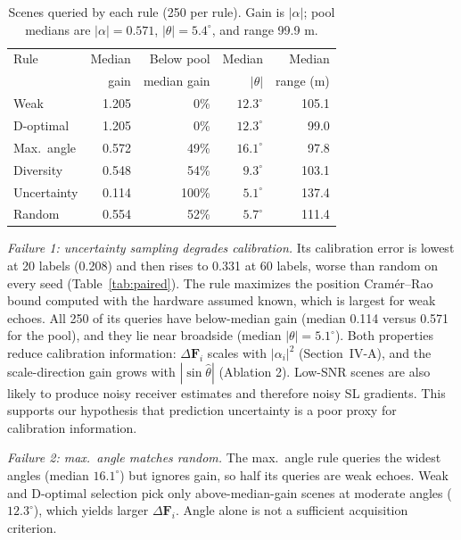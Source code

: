 \documentclass[conference]{IEEEtran}
\newcommand{\F}{\mathbf{F}}
\begin{document}
\begin{table}[t]\centering\small
\caption{Scenes queried by each rule (250 per rule). Gain is $|\alpha|$; pool medians are $|\alpha|=0.571$, $|\theta|=5.4^\circ$, and range 99.9 m.}\label{tab:queries}
\setlength{\tabcolsep}{4pt}
\begin{tabular}{lrrrr}\toprule
Rule & Median & Below pool & Median & Median\\
 & gain & median gain & $|\theta|$ & range (m)\\\midrule
Weak & 1.205 & 0\% & $12.3^\circ$ & 105.1\\
D-optimal & 1.205 & 0\% & $12.3^\circ$ & 99.0\\
Max.\ angle & 0.572 & 49\% & $16.1^\circ$ & 97.8\\
Diversity & 0.548 & 54\% & $9.3^\circ$ & 103.1\\
Uncertainty & 0.114 & 100\% & $5.1^\circ$ & 137.4\\
Random & 0.554 & 52\% & $5.7^\circ$ & 111.4\\\bottomrule
\end{tabular}
\end{table}

\emph{Failure 1: uncertainty sampling degrades calibration.} Its calibration error is lowest at 20 labels (0.208) and then rises to 0.331 at 60 labels, worse than random on every seed (Table~\ref{tab:paired}). The rule maximizes the position Cram\'er--Rao bound computed with the hardware assumed known, which is largest for weak echoes. All 250 of its queries have below-median gain (median 0.114 versus 0.571 for the pool), and they lie near broadside (median $|\theta|=5.1^\circ$). Both properties reduce calibration information: $\Delta\F_i$ scales with $|\alpha_i|^2$ (Section~IV-A), and the scale-direction gain grows with $|\sin\widehat\theta|$ (Ablation 2). Low-SNR scenes are also likely to produce noisy receiver estimates and therefore noisy SL gradients. This supports our hypothesis that prediction uncertainty is a poor proxy for calibration information.

\emph{Failure 2: max.\ angle matches random.} The max.\ angle rule queries the widest angles (median $16.1^\circ$) but ignores gain, so half its queries are weak echoes. Weak and D-optimal selection pick only above-median-gain scenes at moderate angles ($12.3^\circ$), which yields larger $\Delta\F_i$. Angle alone is not a sufficient acquisition criterion.
\end{document}
